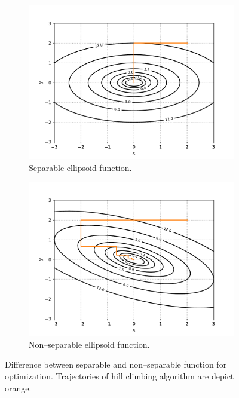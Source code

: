 \begin{figure}
    \begin{subfigure}[t]{0.49\textwidth}
        \includegraphics[width=\textwidth]{img/render_separable.pdf}
        \caption{Separable ellipsoid function.}
        \label{fig:separableelipsoid}
    \end{subfigure}
    \hfill
    \begin{subfigure}[t]{0.49\textwidth}
        \includegraphics[width=\textwidth]{img/render_nonseparable.pdf}
        \caption{Non--separable ellipsoid function.}
        \label{fig:nonseparableelipsoid}
    \end{subfigure}
    \caption[Difference between separable and non--separable function for optimization]{Difference between separable and non--separable function for optimization. Trajectories of hill climbing algorithm are depict orange.}
    \label{fig:separationfucntions}
\end{figure}

